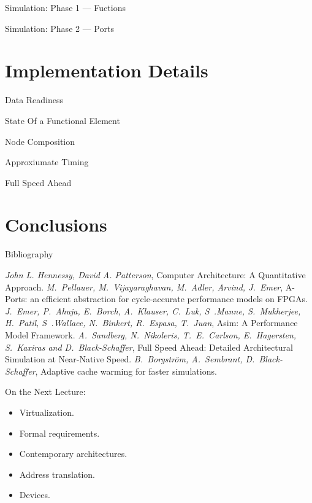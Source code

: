\begin{frame}{Simulation: Phase 1 --- Fuctions}
\centering
{}
\end{frame}

\begin{frame}{Simulation: Phase 2 --- Ports}
\centering
{}
\end{frame}

\section{Implementation Details}

\begin{frame}{Data Readiness}
\centering
{}
\end{frame}

\begin{frame}{State Of a Functional Element}
\centering
{}
\end{frame}

\begin{frame}{Node Composition}
\centering
{}
\end{frame}

\begin{frame}{Approxiumate Timing}
\centering
{}
\end{frame}

\begin{frame}{Full Speed Ahead}
\centering
{}
\end{frame}

\section*{Conclusions}

\begin{frame}[allowframebreaks]{Bibliography}
\begin{thebibliography}{99}
\bibitem{} \textit{John L. Hennessy, David A. Patterson},
  Computer Architecture: A Quantitative Approach.
\bibitem{} \textit{M.~Pellauer, M.~Vijayaraghavan, M.~Adler, Arvind, J.~Emer},
  A-Ports: an efficient abstraction for cycle-accurate performance models on
  FPGAs.
\bibitem{} \textit{J.~Emer, P.~Ahuja, E.~Borch, A.~Klauser, C.~Luk,
  S~.Manne, S.~Mukherjee, H.~Patil, S~.Wallace, N.~Binkert, R.~Espasa, T.~Juan},
  Asim: A Performance Model Framework.
\bibitem{} \textit{A.~Sandberg, N.~Nikoleris, T.~E.~Carlson, E.~Hagersten,
  S.~Kaxiras and D.~Black-Schaffer}, Full Speed Ahead: Detailed Architectural
  Simulation at Near-Native Speed.
\bibitem{} \textit{B.~Borgstr\"{o}m, A.~Sembrant, D.~Black-Schaffer}, Adaptive
  cache warming for faster simulations.
\end{thebibliography}
\end{frame}

\begin{frame}{On the Next Lecture:}
\begin{itemize}
\item Virtualization.
\item Formal requirements.
\item Contemporary architectures.
\item Address translation.
\item Devices.
\end{itemize}
\end{frame}

\finalslide


